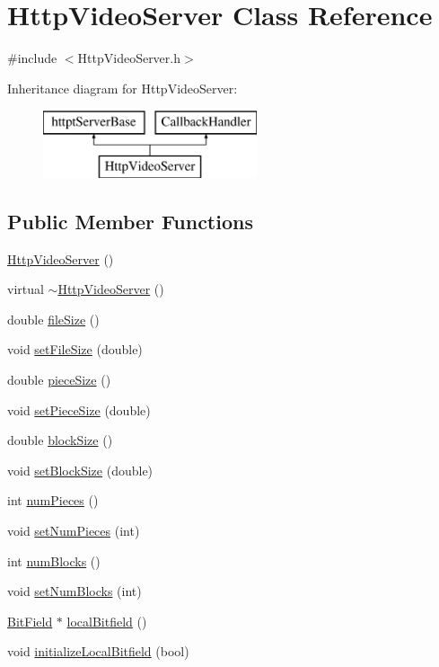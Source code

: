 \hypertarget{classHttpVideoServer}{}\section{Http\+Video\+Server Class Reference}
\label{classHttpVideoServer}


{\ttfamily \#include $<$Http\+Video\+Server.\+h$>$}

Inheritance diagram for Http\+Video\+Server\+:\begin{figure}[H]
\begin{center}
\leavevmode
\includegraphics[height=2.000000cm]{classHttpVideoServer}
\end{center}
\end{figure}
\subsection*{Public Member Functions}
\begin{DoxyCompactItemize}
\item 
\hyperlink{classHttpVideoServer_a1d986a4456ab4b0304a8d3be52a5a8fe}{Http\+Video\+Server} ()
\item 
virtual \hyperlink{classHttpVideoServer_ab66b707c3d507d35137bfa971b3dffb7}{$\sim$\+Http\+Video\+Server} ()
\item 
double \hyperlink{classHttpVideoServer_a9a536cf80f010801085c141553e0840e}{file\+Size} ()
\item 
void \hyperlink{classHttpVideoServer_a40553e7f42d5ad39dc67a5cdaa29d396}{set\+File\+Size} (double)
\item 
double \hyperlink{classHttpVideoServer_aa2dd1fcd255474530247fa57f0732672}{piece\+Size} ()
\item 
void \hyperlink{classHttpVideoServer_a3f5282e81b55f1b70803ac535a985c16}{set\+Piece\+Size} (double)
\item 
double \hyperlink{classHttpVideoServer_a0a8769771ade7f0efb642ca9becf2eda}{block\+Size} ()
\item 
void \hyperlink{classHttpVideoServer_ab8c7c178fedee7a0fecf005bfba02038}{set\+Block\+Size} (double)
\item 
int \hyperlink{classHttpVideoServer_a83e741f6fd02aafa0147f9d9883e1709}{num\+Pieces} ()
\item 
void \hyperlink{classHttpVideoServer_ad45d130635cb7264a65461777c50bdfa}{set\+Num\+Pieces} (int)
\item 
int \hyperlink{classHttpVideoServer_afa57d2d7c4cfb9b095afab2722f74e32}{num\+Blocks} ()
\item 
void \hyperlink{classHttpVideoServer_ac6efcd99e2103e6765ce72eb4ead70c6}{set\+Num\+Blocks} (int)
\item 
\hyperlink{classBitField}{Bit\+Field} $\ast$ \hyperlink{classHttpVideoServer_a812a89eb04d1244bd38c02153741ae4b}{local\+Bitfield} ()
\item 
void \hyperlink{classHttpVideoServer_a32874ad8aee9502fee85f39e4fc85416}{initialize\+Local\+Bitfield} (bool)
\end{DoxyCompactItemize}
